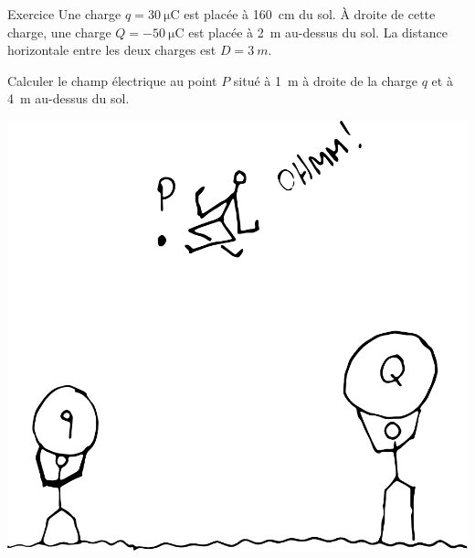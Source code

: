\documentclass{beamer}
\begin{document}
\begin{frame}{Exercice}
  Une charge $q = \SI{30}{\micro\coulomb}$ est placée à \SI{160}{cm} du sol. À
  droite de cette charge, une charge $Q = \SI{-50}{\micro\coulomb}$ est placée
  à \SI{2}{m} au-dessus du sol. La distance horizontale entre les deux charges est $D =
  \SI{3}{m}$.

  Calculer le champ électrique au point $P$ situé à \SI{1}{m} à droite de la
  charge $q$ et à \SI{4}{m} au-dessus du sol.

  \begin{center}
    \includegraphics[scale=0.3]{figures/champ-deux-charges-1.pdf}
  \end{center}
\end{frame}
\end{document}
